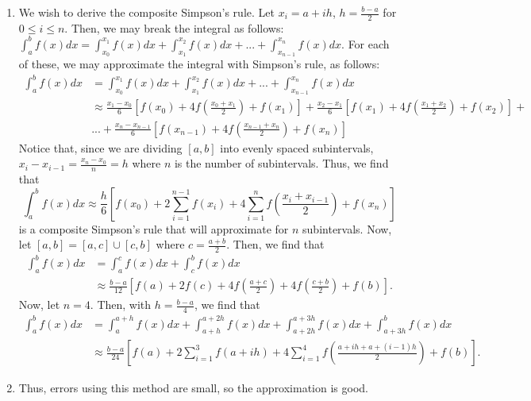 \documentclass{article}
\begin{document}
\begin{enumerate}
\item We wish to derive the composite Simpson's rule. Let $x_i = a + ih$, $h = \frac{b-a}{2}$ for $0 \leq i \leq n$. Then, we may break the integral as follows: $\int_a^b f(x)dx = \int_{x_0}^{x_1}f(x)dx + \int_{x_1}^{x_2}f(x)dx + ... + \int_{x_{n-1}}^{x_n}f(x)dx$. For each of these, we may approximate the integral with Simpson's rule, as follows:
\begin{align*}
	\int_a^b f(x)dx &= \int_{x_0}^{x_1}f(x)dx + \int_{x_1}^{x_2}f(x)dx + ... + \int_{x_{n-1}}^{x_n}f(x)dx\\
	&\approx \frac{x_1-x_0}{6}\left[f(x_0) + 4f\left(\frac{x_0 + x_1}{2}\right) + f(x_1)\right] + \frac{x_2-x_1}{6}\left[f(x_1) + 4f\left(\frac{x_1 + x_2}{2}\right) + f(x_2) \right] +\\
	& ... + \frac{x_n-x_{n-1}}{6}\left[f(x_{n-1}) + 4f\left(\frac{x_{n-1} + x_n}{2}\right)  + f(x_n)\right]
\end{align*}
Notice that, since we are dividing $[a,b]$ into evenly spaced subintervals, $x_i-x_{i-1} = \frac{x_n-x_0}{n} = h$ where $n$ is the number of subintervals. Thus, we find that 
\begin{equation*}
	\int_a^b f(x)dx \approx \frac{h}{6}\left[f(x_0) + 2\sum_{i=1}^{n-1}f(x_i) + 4\sum_{i=1}^{n}f\left(\frac{x_i+x_{i-1}}{2}\right) + f(x_n)\right]
\end{equation*}
is a composite Simpson's rule that will approximate for $n$ subintervals. Now, let $[a,b] = [a,c]\cup[c,b]$ where $c = \frac{a+b}{2}$. Then, we find that
\begin{align*}
\int_a^b f(x)dx &= \int_a^c f(x)dx + \int_c^b f(x)dx\\	
&\approx \frac{b-a}{12}\left[f(a) + 2f(c) + 4f\left(\frac{a+c}{2}\right) + 4f\left(\frac{c + b}{2}\right) + f(b) \right].
\end{align*}
Now, let $n=4$. Then, with $h = \frac{b-a}{4}$, we find that 
\begin{align*}
\int_a^b f(x)dx &= \int_a^{a+h} f(x)dx + 	\int_{a+h}^{a+2h} f(x)dx + \int_{a+2h}^{a+3h} f(x)dx + \int_{a+3h}^b f(x)dx\\
&\approx \frac{b-a}{24}\left[f(a) + 2\sum_{i=1}^{3} f(a+ih) + 4\sum_{i=1}^4f\left(\frac{a+ih + a + (i-1)h}{2}\right) + f(b)\right].
\end{align*}


\item {} Thus, errors using this method are small, so the approximation is good. 


\end{enumerate}
\end{document}
